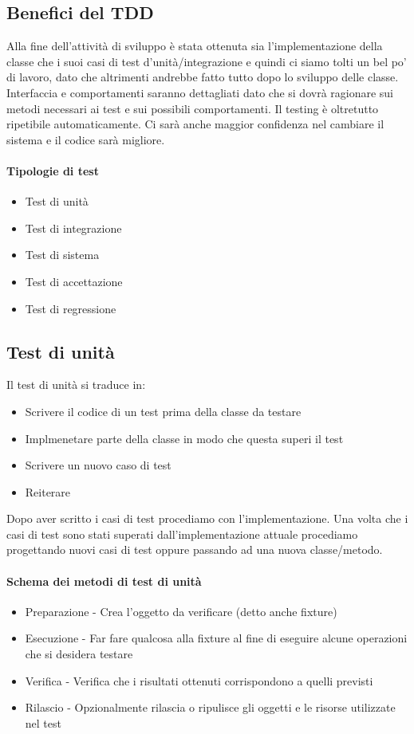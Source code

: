 \subsection{Benefici del TDD}
Alla fine dell'attività di sviluppo è stata ottenuta sia l'implementazione della classe che i suoi
casi di test d'unità/integrazione e quindi ci siamo tolti un bel po' di lavoro, dato che
altrimenti andrebbe fatto tutto dopo lo sviluppo delle classe.\\
Interfaccia e comportamenti saranno dettagliati dato che si dovrà ragionare sui
metodi necessari ai test e sui possibili comportamenti. Il testing è oltretutto ripetibile
automaticamente. Ci sarà anche maggior confidenza nel cambiare il sistema e il codice sarà
migliore.
\paragraph*{Tipologie di test}
\begin{itemize}
    \item Test di unità
    \item Test di integrazione
    \item Test di sistema
    \item Test di accettazione
    \item Test di regressione
\end{itemize}
\subsection{Test di unità}
Il test di unità si traduce in:
\begin{itemize}
    \item Scrivere il codice di un test prima della classe da testare
    \item Implmenetare parte della classe in modo che questa superi il test
    \item Scrivere un nuovo caso di test
    \item Reiterare
\end{itemize}
Dopo aver scritto i casi di test procediamo con l'implementazione.
Una volta che i casi di test sono stati superati dall'implementazione attuale procediamo
progettando nuovi casi di test oppure passando ad una nuova classe/metodo.
\paragraph*{Schema dei metodi di test di unità}
\begin{itemize}
    \item Preparazione - Crea l'oggetto da verificare (detto anche fixture)
    \item Esecuzione - Far fare qualcosa alla fixture al fine di eseguire alcune operazioni
    che si desidera testare
    \item Verifica - Verifica che i risultati ottenuti corrispondono a quelli previsti
    \item Rilascio - Opzionalmente rilascia o ripulisce gli oggetti e le risorse utilizzate nel test
\end{itemize}
